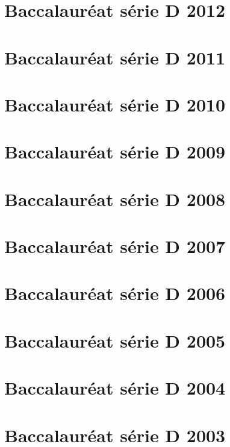 \section{Baccalauréat série D 2012}

\newpage
\section{Baccalauréat série D 2011}

\newpage
\section{Baccalauréat série D 2010}

\newpage
\section{Baccalauréat série D 2009}

\newpage
\section{Baccalauréat série D 2008}

\newpage
\section{Baccalauréat série D 2007}

\newpage
\section{Baccalauréat série D 2006}

\newpage
\section{Baccalauréat série D 2005}

\newpage
\section{Baccalauréat série D 2004}

\newpage
\section{Baccalauréat série D 2003}

\newpage

\appendix


